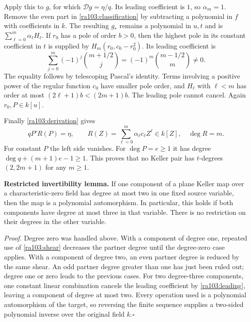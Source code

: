 \documentclass[11pt]{article}
\begin{document}
Apply this to $g$, for which $\mathcal Dg=\eta/q$. Its leading coefficient
is $1$, so $\alpha_m=1$. Remove the even part in
\eqref{ra103:classification} by subtracting a polynomial in $f$ with
coefficients in $k$. The resulting $g_*$ remains a polynomial in $u,t$ and
is $\sum_{\ell=0}^m\alpha_\ell H_\ell$.
If $r_0$ has a pole of order $b>0$, then the highest pole in its constant
coefficient in $t$ is supplied by $H_m(r_0,c_0-r_0^2)$. Its leading
coefficient is
\begin{equation}\label{ra103:binomialpole}
 \sum_{j=0}^m(-1)^j\binom{m+1/2}{j}
       =(-1)^m\binom{m-1/2}{m}\ne0.
\end{equation}
The equality follows by telescoping Pascal's identity. Terms involving a
positive power of the regular function $c_0$ have smaller pole order, and
$H_\ell$ with $\ell<m$ has order at most $(2\ell+1)b<(2m+1)b$.
The leading pole cannot cancel. Again $r_0,P\in k[u]$.

Finally \eqref{ra103:derivation} gives
\begin{equation}\label{ra103:oddcontradiction}
 qP'R(P)=\eta,
 \qquad R(Z)=\sum_{\ell=0}^m\alpha_\ell c_\ell Z^\ell\in k[Z],
 \quad \deg R=m.
\end{equation}
For constant $P$ the left side vanishes. For $\deg P=e\ge1$ it has degree
$\deg q+(m+1)e-1\ge1$. This proves that no Keller pair has $t$-degrees
$(2,2m+1)$ for any $m\ge1$.

\textbf{Restricted invertibility lemma.}
If one component of a plane Keller map over a characteristic-zero field
has degree at most two in one fixed source variable, then the map is a
polynomial automorphism. In particular, this holds if both components have
degree at most three in that variable. There is no restriction on their
degrees in the other variable.

\emph{Proof.} Degree zero was handled above. With a component of degree one,
repeated use of \eqref{ra103:shear} decreases the partner degree until the
degree-zero case applies. With a component of degree two, an even partner
degree is reduced by the same shear. An odd partner degree greater than one
has just been ruled out; degree one or zero leads to the previous cases.
For two degree-three components, one constant linear combination cancels
the leading coefficient by \eqref{ra103:leading}, leaving a component of
degree at most two. Every operation used is a polynomial automorphism of the
target, so reversing the finite sequence supplies a two-sided polynomial
inverse over the original field $k$.\hfill$\square$
\end{document}
